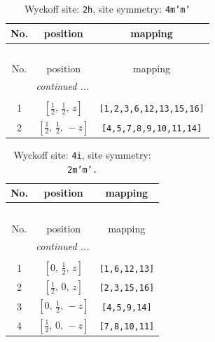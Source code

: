 \documentclass[fleqn,8pt]{jsarticle}
\begin{document}
\begin{longtable}{ccc}
\caption{Wyckoff site: {\tt 2h}, site symmetry: {\tt 4m'm'}}
 \\
 \hline \hline
No. & position & mapping \\ \hline \endfirsthead

\multicolumn{2}{l}{\tablename\ \thetable{}} \\
 \hline \hline
No. & position & mapping \\ \hline \endhead

 \hline \hline
\multicolumn{2}{r}{\footnotesize\it continued ...} \\ \endfoot

 \hline \hline
\multicolumn{2}{r}{} \\ \endlastfoot

1 & $\left[ \frac{1}{2},\, \frac{1}{2},\, z \right]$ & {\tt [1,2,3,6,12,13,15,16]} \\ \hline
2 & $\left[ \frac{1}{2},\, \frac{1}{2},\, - z \right]$ & {\tt [4,5,7,8,9,10,11,14]} \\
\end{longtable}
\renewcommand{\arraystretch}{1.2}
\begin{longtable}{ccc}
\caption{Wyckoff site: {\tt 4i}, site symmetry: {\tt 2m'm'.}}
 \\
 \hline \hline
No. & position & mapping \\ \hline \endfirsthead

\multicolumn{2}{l}{\tablename\ \thetable{}} \\
 \hline \hline
No. & position & mapping \\ \hline \endhead

 \hline \hline
\multicolumn{2}{r}{\footnotesize\it continued ...} \\ \endfoot

 \hline \hline
\multicolumn{2}{r}{} \\ \endlastfoot

1 & $\left[ 0,\, \frac{1}{2},\, z \right]$ & {\tt [1,6,12,13]} \\ \hline
2 & $\left[ \frac{1}{2},\, 0,\, z \right]$ & {\tt [2,3,15,16]} \\ \hline
3 & $\left[ 0,\, \frac{1}{2},\, - z \right]$ & {\tt [4,5,9,14]} \\ \hline
4 & $\left[ \frac{1}{2},\, 0,\, - z \right]$ & {\tt [7,8,10,11]} \\
\end{longtable}
\renewcommand{\arraystretch}{1.2}
\end{document}
